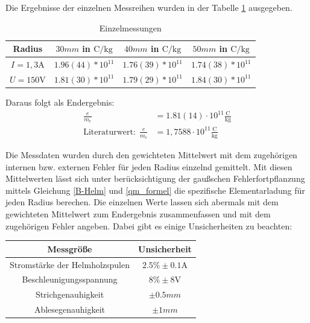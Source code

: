 \documentclass[11pt, a4paper]{article}
\begin{document}
        Die Ergebnisse der einzelnen Messreihen wurden in der Tabelle \ref{tab:einzelmessungen} ausgegeben.
        \begin{table}[H]
            \centering

            \begin{tabular}{c | c | c | c}
                Radius &  $30 \si{mm}$ in $\si{\coulomb\per\kilogram}$ & $40 \si{mm}$ in $\si{\coulomb\per\kilogram}$& $50 \si{mm}$ in $\si{\coulomb\per\kilogram}$ \\ \hline
                $I = 1,3 \si{\ampere}$  & $1.96(44) * 10^{11}$ & $1.76(39) * 10^{11}$ &$1.74(38) * 10^{11}$ \\
                $U = 150 \si{\volt}$ & $1.81(30) * 10^{11}$ & $1.79(29) * 10^{11}$ &$1.84(30) * 10^{11}$ \\
            \end{tabular}
            \label{tab:einzelmessungen}
            \caption{Einzelmessungen}
        \end{table}
        
        Daraus folgt als Endergebnis: 
        \begin{align}
            \frac{e}{m_e} &= 1.81(14) \cdot 10^{11} \frac{\si{\coulomb}}{\si{\kilogram}} \label{emend} \\
            \text{Literaturwert:} \ \ \frac{e}{m_e} &= 1,7588 \cdot 10^{11} \frac{\si{\coulomb}}{\si{\kilogram}}
        \end{align}

        Die Messdaten wurden durch den gewichteten Mittelwert \cite[Kapitel 5]{ABW} mit dem zugehörigen internen bzw. externen Fehler für jeden Radius einzelnd gemittelt.
        Mit diesen Mittelwerten lässt sich unter berücksichtigung der gaußschen Fehlerfortpflanzung \cite[(19)]{ABW} mittels Gleichung \ref{B-Helm} und \ref{qm_formel} die spezifische Elementarladung für jeden Radius berechen. Die einzelnen Werte lassen sich abermals mit dem gewichteten Mittelwert zum Endergebnis zusammenfassen und mit dem zugehörigen Fehler angeben.
        Dabei gibt es einige Unsicherheiten zu beachten:
        \begin{table}[H]
            \centering
          

            \begin{tabular}{c | c}
                Messgröße & Unsicherheit \\ \hline
                Stromstärke der Helmholzspulen  & $2.5 \% \pm 0.1 \si{\ampere}$ \cite{vc130} \\
                Beschleunigungsspannung & $ 8\% \pm 8 \si{\volt}$ \cite{vc120}\\
                Strichgenauhigkeit & $\pm 0.5 \si{mm}$ \\
                Ablesegenauhigkeit & $\pm 1 \si{mm}$\\
            \end{tabular}
        \end{table}
        
\end{document}
